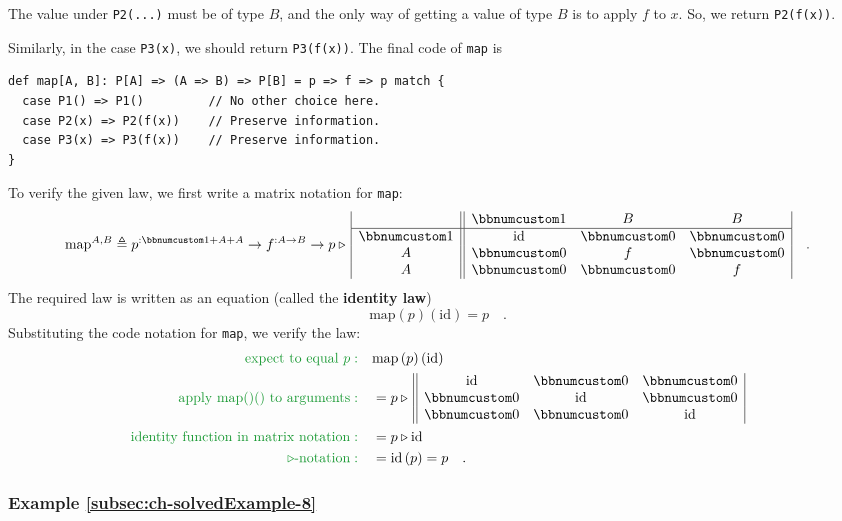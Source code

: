 The value under \lstinline!P2(...)! must be of type $B$, and the
only way of getting a value of type $B$ is to apply $f$ to $x$.
So, we return \lstinline!P2(f(x))!.

Similarly, in the case \lstinline!P3(x)!, we should return \lstinline!P3(f(x))!.
The final code of \lstinline!map! is
\begin{lstlisting}
def map[A, B]: P[A] => (A => B) => P[B] = p => f => p match {
  case P1() => P1()         // No other choice here.
  case P2(x) => P2(f(x))    // Preserve information.
  case P3(x) => P3(f(x))    // Preserve information.
}
\end{lstlisting}

To verify the given law, we first write a matrix notation for \lstinline!map!:
\[
\text{map}^{A,B}\triangleq p^{:\bbnum 1+A+A}\rightarrow f^{:A\rightarrow B}\rightarrow p\triangleright\,\begin{array}{|c||ccc|}
 & \bbnum 1 & B & B\\
\hline \bbnum 1 & \text{id} & \bbnum 0 & \bbnum 0\\
A & \bbnum 0 & f & \bbnum 0\\
A & \bbnum 0 & \bbnum 0 & f
\end{array}\quad.
\]
The required law is written as an equation (called the
\textbf{identity law})
\[
\text{map}\left(p\right)(\text{id})=p\quad.
\]
Substituting the code notation for \lstinline!map!, we verify the
law:
\begin{align*}
{\color{greenunder}\text{expect to equal }p:}\quad & \text{map}\left(p\right)(\text{id})\\
{\color{greenunder}\text{apply map()() to arguments}:}\quad & =p\triangleright\,\begin{array}{||ccc|}
\text{id} & \bbnum 0 & \bbnum 0\\
\bbnum 0 & \text{id} & \bbnum 0\\
\bbnum 0 & \bbnum 0 & \text{id}
\end{array}\\
{\color{greenunder}\text{identity function in matrix notation}:}\quad & =p\triangleright\text{id}\\
{\color{greenunder}\triangleright\text{-notation}:}\quad & =\text{id}\left(p\right)=p\quad.
\end{align*}


\subsubsection{Example \label{subsec:ch-solvedExample-8}\ref{subsec:ch-solvedExample-8}}

